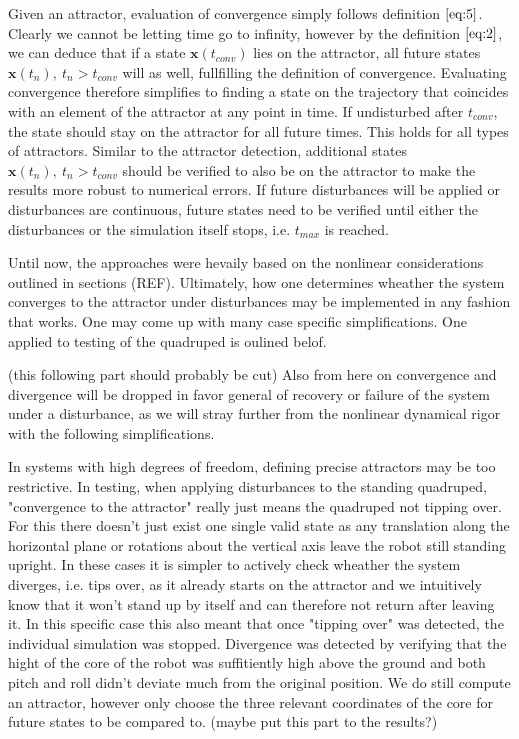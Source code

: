     Given an attractor, evaluation of convergence simply follows definition $\ref{eq:5}$. Clearly we cannot be letting time go to infinity, however by the definition $\ref{eq:2}$, we can deduce that if a state $\mathbf{x}(t_{conv})$ lies on the attractor, all future states $\mathbf{x}(t_n),\ t_n > t_{conv}$ will as well, fullfilling the definition of convergence. 
 Evaluating convergence therefore simplifies to finding a state on the trajectory that coincides with an element of the attractor at any point in time. If undisturbed after $t_{conv}$, the state should stay on the attractor for all future times. This holds for all types of attractors. Similar to the attractor detection, additional states $\mathbf{x}(t_n),\ t_n>t_{conv}$ should be verified to also be on the attractor to make the results more robust to numerical errors. If future disturbances will be applied or disturbances are continuous, future states need to be verified until either the disturbances or the simulation itself stops, i.e. $t_{max}$ is reached. 

 Until now, the approaches were hevaily based on the nonlinear considerations outlined in sections (REF). Ultimately, how one determines wheather the system converges to the attractor under disturbances may be implemented in any fashion that works. One may come up with many case specific simplifications. One applied to testing of the quadruped is oulined belof. 

 (this following part should probably be cut)
 Also from here on convergence and divergence will be dropped in favor general of recovery or failure of the system under a disturbance, as we will stray further from the nonlinear dynamical rigor with the following simplifications. 

 In systems with high degrees of freedom, defining precise attractors may be too restrictive. 
 In testing, when applying disturbances to the standing quadruped, "convergence to the attractor" really just means the quadruped not tipping over. For this there doesn't just exist one single valid state as any translation along the horizontal plane or rotations about the vertical axis leave the robot still standing upright. In these cases it is simpler to actively check wheather the system diverges, i.e. tips over, as it already starts on the attractor and we intuitively know that it won't stand up by itself and can therefore not return after leaving it. In this specific case this also meant that once "tipping over" was detected, the individual simulation was stopped.  Divergence was detected by verifying that the hight of the core of the robot was suffitiently high above the ground and both pitch and roll didn't deviate much from the original position. We do still compute an attractor, however only choose the three relevant coordinates of the core for future states to be compared to. (maybe put this part to the results?)

